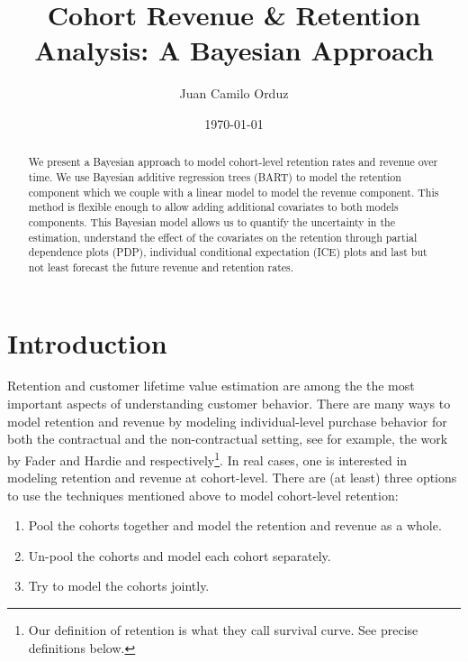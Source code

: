 \documentclass[11pt]{amsart}
\theoremstyle{definition}
\begin{document}
\title{Cohort Revenue \& Retention Analysis: A Bayesian Approach}
\author{Juan Camilo Orduz}
\address{Berlin, Germany}
\date{\today}

\begin{abstract}
We present a Bayesian approach to model cohort-level retention rates and revenue over
time. We use Bayesian additive regression trees (BART) to model the retention
component which we couple with a linear model to model the revenue component.
This method is flexible enough to allow adding additional covariates to both models
components. This Bayesian model allows us to quantify the uncertainty in the
estimation, understand the effect of the covariates on the retention through partial
dependence plots (PDP), individual conditional expectation (ICE) plots and last but not
least forecast the future revenue and retention rates.
\end{abstract}

\maketitle

\tableofcontents
{}

\section{Introduction}

Retention and customer lifetime value estimation are among the the most important aspects
of understanding customer behavior. There are many ways to model retention and revenue 
by modeling individual-level purchase behavior for both the contractual and the
non-contractual setting, see for example, the work by Fader and Hardie
\cite{FaderHardie2007} and \cite{FaderHardie2005} respectively\footnote{Our definition
of retention is what they call survival curve. See precise definitions below.}. In real
cases, one is interested in modeling retention and revenue at cohort-level. There are
(at least) three options to use the techniques mentioned above to model cohort-level
retention:

\begin{enumerate}
    \item Pool the cohorts together and model the retention and revenue as a whole.
    \item Un-pool the cohorts and model each cohort separately.
    \item Try to model the cohorts jointly.
\end{enumerate}
\end{document}
